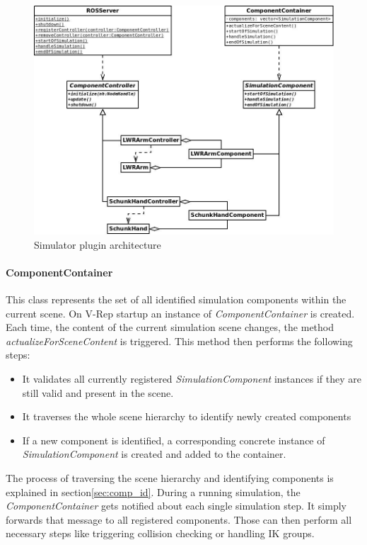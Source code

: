 \begin{figure}[t]
	\centering
  	\includegraphics[width=1.0\textwidth]{images/SimulatorPluginUML.jpg}
	\caption{Simulator plugin architecture}
	\label{fig:plugin_uml}
\end{figure}

\paragraph{ComponentContainer}

This class represents the set of all identified simulation components within the current scene. On V-Rep startup an instance of \emph{ComponentContainer} is created. Each time, the content of the current simulation scene changes, the method \emph{actualizeForSceneContent} is triggered. This method then performs the following steps:
\begin{itemize}

\item
It validates all currently registered \emph{SimulationComponent} instances if they are still valid and present in the scene.
\item
It traverses the whole scene hierarchy to identify newly created components
\item
If a new component is identified, a corresponding concrete instance of \emph{SimulationComponent} is created and added to the container.

\end{itemize}
  
The process of traversing the scene hierarchy and identifying components is explained in section\ref{sec:comp_id}. During a running simulation, the \emph{ComponentContainer} gets notified about each single simulation step. It simply forwards that message to all registered components. Those can then perform all necessary steps like triggering collision checking or handling IK groups.
  
